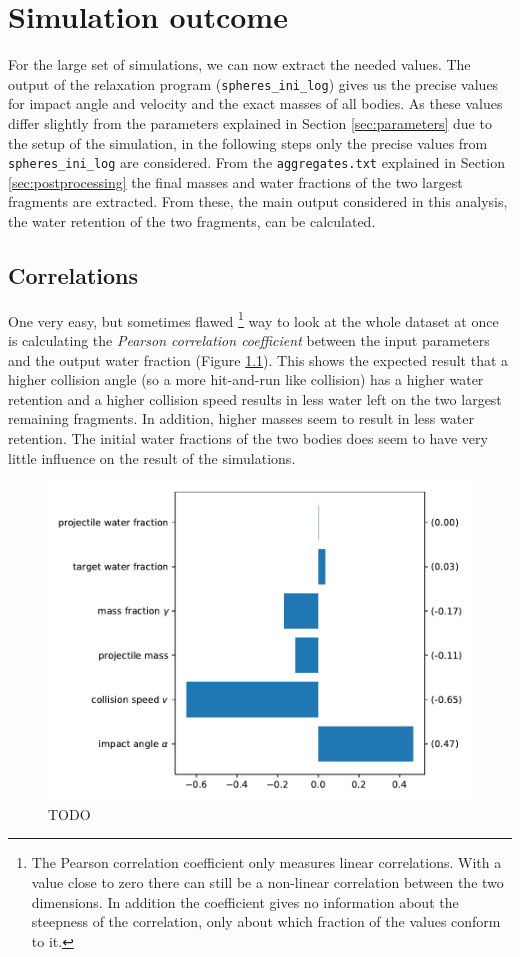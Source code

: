 \chapter{Simulation outcome}
\label{chapter:results}

For the large set of simulations, we can now extract the needed values. The output of the relaxation program (\texttt{spheres\_ini\_log}) gives us the precise values for impact angle and velocity and the exact masses of all bodies. As these values differ slightly from the parameters explained in Section \ref{sec:parameters} due to the setup of the simulation, in the following steps only the precise values from \texttt{spheres\_ini\_log} are considered. From the \texttt{aggregates.txt} explained in Section \ref{sec:postprocessing} the final masses and water fractions of the two largest fragments are extracted. From these, the main output considered in this analysis, the water retention of the two fragments, can be calculated. 

\section{Correlations}
\label{sec:cov}
One very easy, but sometimes flawed%
\footnote{The Pearson correlation coefficient only measures linear correlations. With a value close to zero there can still be a non-linear correlation between the two dimensions. In addition the coefficient gives no information about the steepness of the correlation, only about which fraction of the values conform to it.} 
way to look at the whole dataset at once is calculating the \textit{Pearson correlation coefficient} between the input parameters and the output water fraction (Figure \ref{fig:cov}). This shows the expected result that a higher collision angle (so a more hit-and-run like collision) has a higher water retention and a higher collision speed results in less water left on the two largest remaining fragments. In addition, higher masses seem to result in less water retention. The initial water fractions of the two bodies does seem to have very little influence on the result of the simulations.

\begin{figure}[h]
	\centering
	\includegraphics[width=0.6\linewidth]{images/cov.pdf}
	\caption{TODO}
	\label{fig:cov}
\end{figure}